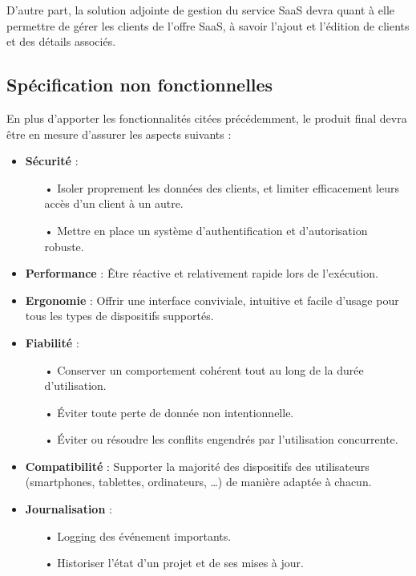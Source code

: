 \begin{spacing}{1.5}
D'autre part, la solution adjointe de gestion du service SaaS devra quant à elle permettre de gérer les clients de l'offre SaaS, à savoir l'ajout et l'édition de clients et des détails associés.

\subsection{Spécification non fonctionnelles}
En plus d’apporter les fonctionnalités citées précédemment, le produit final devra être en mesure d'assurer les aspects suivants :
\begin{itemize}
    \item \textbf{Sécurité} :
        \begin{itemize}
            \item[•] Isoler proprement les données des clients, et limiter efficacement leurs accès d'un client à un autre.
            \item[•] Mettre en place un système d’authentification et d’autorisation robuste.
        \end{itemize}
    \item \textbf{Performance} : Être réactive et relativement rapide lors de l'exécution.
    \item \textbf{Ergonomie} : Offrir une interface conviviale, intuitive et facile d’usage pour tous les types de dispositifs supportés.
    \item \textbf{Fiabilité} :
        \begin{itemize}
            \item[•] Conserver un comportement cohérent tout au long de la durée d'utilisation.
            \item[•] Éviter toute perte de donnée non intentionnelle.
            \item[•] Éviter ou résoudre les conflits engendrés par l’utilisation concurrente.
        \end{itemize}
    \item \textbf{Compatibilité} : Supporter la majorité des dispositifs des utilisateurs (smartphones, tablettes, ordinateurs, …) de manière adaptée à chacun.
    \item \textbf{Journalisation} :
        \begin{itemize}
            \item[•] Logging des événement importants.
            \item[•] Historiser l'état d'un projet et de ses mises à jour.
        \end{itemize}
\end{itemize}


\end{spacing}
